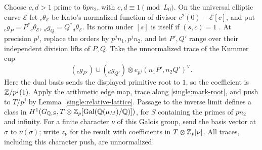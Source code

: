 Choose \(c,d>1\) prime to \(6pn_2\), with
\(c,d\equiv1\pmod{L_0}\).  On the universal elliptic curve \(\mathcal E\)
let \({}_c\theta_{\mathcal E}\) be Kato's normalized function of divisor
\(c^2(0)-\mathcal E[c]\), and put
\({}_cg_P=P^*{}_c\theta_{\mathcal E}\), \({}_dg_Q=Q^*{}_d\theta_{\mathcal E}\).
Its norm under \([s]\) is itself if \((s,c)=1\)
\cite[Sections~1--2]{Kato}.
At precision \(p^j\), replace the orders by \(p^jn_1,p^jn_2\), and
let \(P',Q'\) range over their independent division lifts of \(P,Q\).
Take the unnormalized trace of the Kummer cup
\begin{equation}\label{single:K1}
 ({}_cg_{P'})\cup({}_dg_{Q'})\otimes
 e_{p^j}(n_1P',n_2Q')^\vee.
\end{equation}
Here the dual basis sends the displayed primitive root to \(1\), so the
coefficient is \(\mathbb Z/p^j(1)\).  Apply the arithmetic edge map, trace
along \eqref{single:mark-root}, and push to \(T/p^j\) by
Lemma~\ref{single:relative-lattice}.  Passage to the inverse limit
defines a class in \(H^1(G_{\mathbb Q,S},
T\otimes\mathbb Z_p[\operatorname{Gal}(\mathbb Q(\mu_M)/\mathbb Q)])\), for \(S\) containing the
primes of \(pn_2\) and infinity.
For a finite character \(\nu\) of this Galois group, send the basis
vector at \(\sigma\) to \(\nu(\sigma)\); write \(z_\nu\) for the result
with coefficients in \(T\otimes\mathbb Z_p[\nu]\).
All traces, including this character push, are unnormalized.

